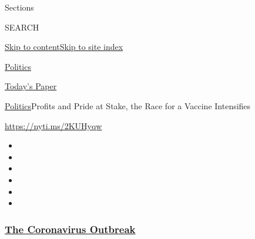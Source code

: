 Sections

SEARCH

\protect\hyperlink{site-content}{Skip to
content}\protect\hyperlink{site-index}{Skip to site index}

\href{https://www.nytimes3xbfgragh.onion/section/politics}{Politics}

\href{https://myaccount.nytimes3xbfgragh.onion/auth/login?response_type=cookie\&client_id=vi}{}

\href{https://www.nytimes3xbfgragh.onion/section/todayspaper}{Today's
Paper}

\href{/section/politics}{Politics}\textbar{}Profits and Pride at Stake,
the Race for a Vaccine Intensifies

\url{https://nyti.ms/2KUHyqw}

\begin{itemize}
\item
\item
\item
\item
\item
\item
\end{itemize}

\hypertarget{the-coronavirus-outbreak}{%
\subsubsection{\texorpdfstring{\href{https://www.nytimes3xbfgragh.onion/news-event/coronavirus?name=styln-coronavirus-national\&region=TOP_BANNER\&block=storyline_menu_recirc\&action=click\&pgtype=Article\&impression_id=cd9471c0-f273-11ea-85e4-7f6370b9a399\&variant=undefined}{The
Coronavirus
Outbreak}}{The Coronavirus Outbreak}}\label{the-coronavirus-outbreak}}

